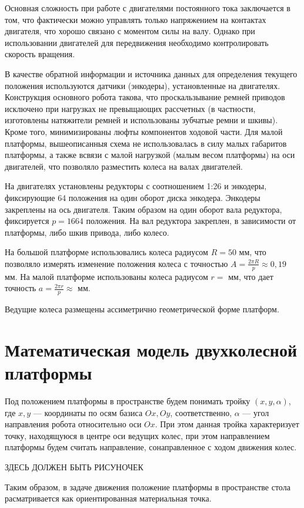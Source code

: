 \documentclass[12pt]{report}
\begin{document}
Основная сложность при работе с двигателями постоянного тока заключается в том, что фактически можно управлять только напряжением на контактах двигателя, что хорошо связано с моментом силы на валу. Однако при использовании двигателей для передвижения необходимо контролировать скорость вращения.

В качестве обратной информации и источника данных для определения текущего положения используются датчики (энкодеры), установленные на двигателях. Конструкция основного робота такова, что проскальзывание ремней приводов исключено при нагрузках не превыщающих рассчетных (в частности, изготовлены натяжители ремней и использованы зубчатые ремни и шкивы). Кроме того, минимизированы люфты компонентов ходовой части. Для малой платформы, вышеописанныя схема не использовалась в силу малых габаритов платформы, а также всвязи с малой нагрузкой (малым весом платформы) на оси двигателей, что позволяло разместить колеса на валах двигателей.

На двигателях установлены редукторы с соотношением 1:26 и энкодеры, фиксирующие 64 положения на один оборот диска энкодера. Энкодеры закреплены на ось двигателя. Таким образом на один оборот вала редуктора, фиксируется $p = 1664$ положения. На вал редуктора закреплен, в зависимости от платформы, либо шкив привода, либо колесо.

На большой платформе использовались колеса радиусом  $R = 50$ мм, что позволяло измерять изменение положения колеса с точностью $A = \frac{2  \pi R }{p} \approx 0,19$ мм. На малой платформе использованы колеса радиусом  $r = $ мм, что дает точность $a = \frac{2  \pi r }{p} \approx $ мм.

Ведущие колеса размещены ассиметрично геометрической форме платформ.


\section{Математическая модель двухколесной платформы}
Под положением платформы в пространстве будем понимать тройку $(x, y, \alpha)$, где $x, y$ --- координаты по осям базиса $Ox, Oy$, соответственно, $\alpha$ --- угол направления робота относительно оси $Ox$. При этом данная тройка характеризует точку, находящуюся в центре оси ведущих колес, при этом направлением платформы будем считать направление, сонаправленное с ходом движения колес.

ЗДЕСЬ ДОЛЖЕН БЫТЬ РИСУНОЧЕК

Таким образом, в задаче движения положение платформы в пространстве стола расматривается как ориентированная материальная точка.
\end{document}
